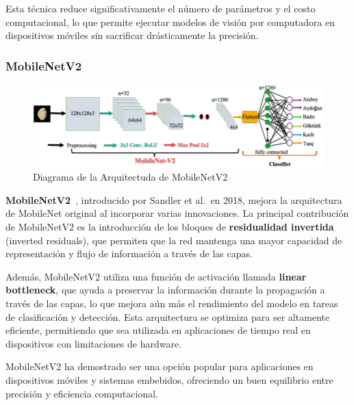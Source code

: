Esta técnica reduce significativamente el número de parámetros y el costo computacional, lo que permite ejecutar
modelos de visión por computadora en dispositivos móviles sin sacrificar drásticamente la precisión.

\subsubsection{MobileNetV2}\label{subsubsec:mobilenetv2}

\begin{figure}[htp] \label{fig:mobilenetv2}
    \begin{center}
        \includegraphics[width=1\textwidth]{imagenes/mobilenetv2}
    \end{center}
    \caption[MobileNetV2]{Diagrama de la Arquitectuda de MobileNetV2}
\end{figure}

\textbf{MobileNetV2}~\cite{sandlerMobileNetV2InvertedResiduals2019}, introducido por Sandler et al.\ en 2018, mejora la arquitectura
de MobileNet original al incorporar varias innovaciones.
La principal contribución de MobileNetV2 es la introducción de los bloques de \textbf{residualidad invertida} (inverted
residuals), que permiten que la red mantenga una mayor capacidad de representación y flujo de información a través de
las capas.


Además, MobileNetV2 utiliza una función de activación llamada \textbf{linear bottleneck}, que ayuda a preservar la
información durante la propagación a través de las capas, lo que mejora aún más el rendimiento del modelo en tareas de
clasificación y detección.
Esta arquitectura se optimiza para ser altamente eficiente, permitiendo que sea utilizada en aplicaciones de tiempo
real en dispositivos con limitaciones de hardware.


MobileNetV2 ha demostrado ser una opción popular para aplicaciones en dispositivos móviles y sistemas embebidos,
ofreciendo un buen equilibrio entre precisión y eficiencia computacional.
